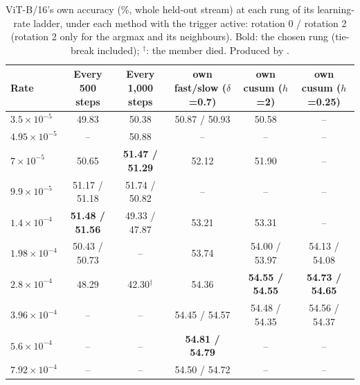 \begin{table}[t]
  \centering\small
  \begin{tabular}{@{}lccccc@{}}
    \toprule
    Rate & Every 500 steps & Every 1,000 steps & own fast/slow ($\delta$=0.7) & own cusum ($h$=2) & own cusum ($h$=0.25) \\
    \midrule
    $3.5\!\times\!10^{-5}$ & 49.83 & 50.38 & 50.87 / 50.93 & 50.58 & -- \\
    $4.95\!\times\!10^{-5}$ & -- & 50.88 & -- & -- & -- \\
    $7\!\times\!10^{-5}$ & 50.65 & \textbf{51.47 / 51.29} & 52.12 & 51.90 & -- \\
    $9.9\!\times\!10^{-5}$ & 51.17 / 51.18 & 51.74 / 50.82 & -- & -- & -- \\
    $1.4\!\times\!10^{-4}$ & \textbf{51.48 / 51.56} & 49.33 / 47.87 & 53.21 & 53.31 & -- \\
    $1.98\!\times\!10^{-4}$ & 50.43 / 50.73 & -- & 53.74 & 54.00 / 53.97 & 54.13 / 54.08 \\
    $2.8\!\times\!10^{-4}$ & 48.29 & 42.30$^\dagger$ & 54.36 & \textbf{54.55 / 54.55} & \textbf{54.73 / 54.65} \\
    $3.96\!\times\!10^{-4}$ & -- & -- & 54.45 / 54.57 & 54.48 / 54.35 & 54.56 / 54.37 \\
    $5.6\!\times\!10^{-4}$ & -- & -- & \textbf{54.81 / 54.79} & -- & -- \\
    $7.92\!\times\!10^{-4}$ & -- & -- & 54.50 / 54.72 & -- & -- \\
    \bottomrule
  \end{tabular}
  \caption{ViT-B/16's own accuracy (\%, whole held-out stream) at each rung of its learning-rate ladder, under each method with the trigger active: rotation 0 / rotation 2 (rotation 2 only for the argmax and its neighbours). Bold: the chosen rung (tie-break included); $^\dagger$: the member died. Produced by .}
  \label{tab:tune_rates_large}
\end{table}
